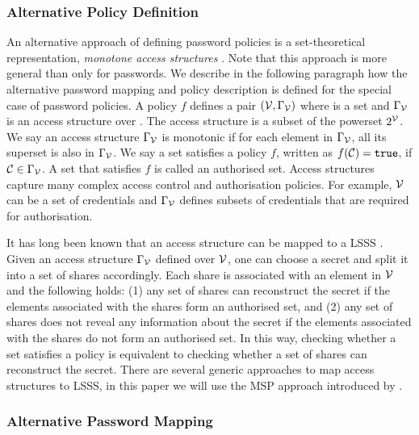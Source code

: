 \subsubsection{Alternative Policy Definition} \label{sec:lsss}
An alternative approach of defining password policies is a set-theoretical representation, \ie \emph{monotone access structures} \cite{ito89}.
Note that this approach is more general than only for passwords.
We describe in the following paragraph how the alternative password mapping and policy description is defined for the special case of password policies.
A policy $f$ defines a pair $(\mathcal{V},\Gamma_\mathcal{V})$ where \ServerSet is a set and $\Gamma_\mathcal{V}$ is an access structure over \ServerSet. 
The access structure is a subset of the powerset $2^\mathcal{V}$. 
We say an access structure $\Gamma_\mathcal{V}$ is monotonic if for each element in $\Gamma_\mathcal{V}$, all its superset is also in $\Gamma_\mathcal{V}$. 
We say a set \cC satisfies a policy $f$, written as $f(\mathcal{C})=\mathtt{true}$, if $\mathcal{C}\in \Gamma_\mathcal{V}$. 
A set \cC that satisfies $f$ is called an authorised set. 
Access structures capture many complex access control and authorisation policies. For example, $\mathcal{V}$ can be a set of credentials and $\Gamma_\mathcal{V}$ defines subsets of credentials that are required for authorisation.

It has long been known that an access structure can be mapped to a \ac{LSSS} \cite{ito89,bei96}. 
Given an access structure $\Gamma_\mathcal{V}$ defined over $\mathcal{V}$, one can choose a secret and split it into a set of shares accordingly. 
Each share is associated with an element in $\mathcal{V}$ and the following holds: 
(1) any set of shares can reconstruct the secret if the elements associated with the shares form an authorised set, and 
(2) any set of shares does not reveal any information about the secret if the elements associated with the shares do not form an authorised set.
In this way, checking whether a set satisfies a policy is equivalent to checking whether a set of shares can reconstruct the secret. 
There are several generic approaches to map access structures to \ac{LSSS}, in this paper we will use the \ac{MSP} approach introduced by \citet{bei96}. 

\subsubsection{Alternative Password Mapping}

